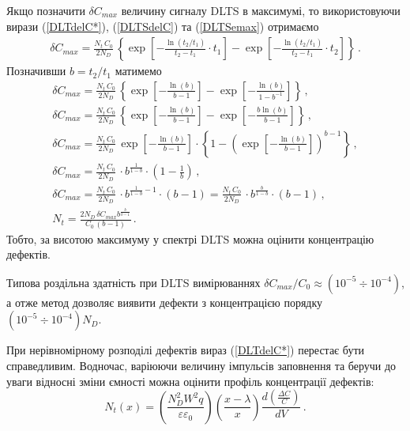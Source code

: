 Якщо позначити $\delta C_{max}$ величину сигналу DLTS в максимумі,
то використовуючи вирази (\ref{DLTdelC*}), (\ref{DLTSdelC}) та (\ref{DLTSemax}) отримаємо
\begin{gather*}
  \delta C_{max}=\frac{N_t\,C_0}{2N_D}\,\left\{\exp\left[-\frac{\ln\left(t_2/t_1\right)}{t_2-t_1}\cdot t_1\right]
     -\exp\left[-\frac{\ln\left(t_2/t_1\right)}{t_2-t_1}\cdot t_2\right]\right\}\,.\nonumber
\end{gather*}
Позначивши $b=t_2/t_1$ матимемо
\begin{gather}
  \delta C_{max}=\frac{N_t\,C_0}{2N_D}\,\left\{\exp\left[-\frac{\ln\left(b\right)}{b-1}\right]
     -\exp\left[-\frac{\ln\left(b\right)}{1-b^{-1}} \right]\right\}\,,\nonumber\\
  \delta C_{max}=\frac{N_t\,C_0}{2N_D}\,\left\{\exp\left[-\frac{\ln\left(b\right)}{b-1}\right]
     -\exp\left[-\frac{b\ln\left(b\right)}{b-1} \right]\right\}\,,\nonumber\\
  \delta C_{max}=\frac{N_t\,C_0}{2N_D}\,\exp\left[-\frac{\ln\left(b\right)}{b-1}\right]\cdot
  \left\{1 -\left(\exp\left[-\frac{\ln\left(b\right)}{b-1} \right]\right)^{b-1}\right\}\,,\nonumber  \\
  \delta C_{max}=\frac{N_t\,C_0}{2N_D}\,\cdot b^{\frac{1}{1-b}}\cdot
  \left(1-\frac{1}{b}\right)\,,\nonumber     \\
    \delta C_{max}=\frac{N_t\,C_0}{2N_D}\,\cdot b^{\frac{1}{1-b}-1}\cdot \left(b-1\right)
                  =\frac{N_t\,C_0}{2N_D}\,\cdot b^{\frac{b}{1-b}}\cdot \left(b-1\right)\,,\nonumber \\
    N_t=\frac{2N_D\,\delta C_{max}b^{\frac{b}{b-1}}}{C_0\,(b-1)}\,.
\end{gather}
Тобто, за висотою максимуму у спектрі DLTS можна  оцінити концентрацію дефектів.

Типова роздільна здатність при DLTS вимірюваннях $\delta C_{max}/C_0\approx(10^{-5}\div 10^{-4})$,
а отже метод дозволяє виявити дефекти з концентрацією порядку $(10^{-5}\div 10^{-4})N_D$.


При нерівномірному розподілі дефектів вираз (\ref{DLTdelC*}) перестає бути справедливим.
Водночас, варіюючи величину імпульсів заповнення та беручи до уваги відносні зміни ємності
можна оцінити профіль концентрації дефектів:
\begin{equation}
\label{DLTSNt}
N_t(x)=\left(\frac{N_D^2W^2q}{\varepsilon\varepsilon_0}\right)\left(\frac{x-\lambda}{x}\right)\frac{d\left(\frac{\Delta C}{C}\right)}{dV}\,.
\end{equation}

